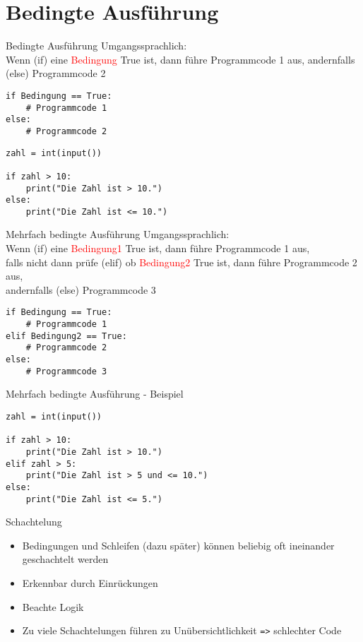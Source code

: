 \section{Bedingte Ausführung}

\begin{frame}[fragile]{Bedingte Ausführung}
Umgangssprachlich:\\ Wenn (if) eine \textcolor{red}{Bedingung} True ist, dann führe Programmcode 1 aus, andernfalls (else) Programmcode 2\\

\begin{lstlisting}
if Bedingung == True:
	# Programmcode 1 
else:
	# Programmcode 2 
\end{lstlisting}

\begin{lstlisting}
zahl = int(input())

if zahl > 10:
	print("Die Zahl ist > 10.")
else:
	print("Die Zahl ist <= 10.")
\end{lstlisting}
\end{frame}

\begin{frame}[fragile]{Mehrfach bedingte Ausführung}
Umgangssprachlich:\\ Wenn (if) eine \textcolor{red}{Bedingung1} True ist, dann führe Programmcode 1 aus, \\falls nicht dann prüfe (elif) ob \textcolor{red}{Bedingung2} True ist, dann führe Programmcode 2 aus, \\andernfalls (else) Programmcode 3\\

\begin{lstlisting}
if Bedingung == True:
	# Programmcode 1
elif Bedingung2 == True:
	# Programmcode 2
else:
	# Programmcode 3
\end{lstlisting}
\end{frame}

\begin{frame}[fragile]{Mehrfach bedingte Ausführung - Beispiel}
\begin{lstlisting}
zahl = int(input())

if zahl > 10:
	print("Die Zahl ist > 10.")
elif zahl > 5:
	print("Die Zahl ist > 5 und <= 10.")
else:
	print("Die Zahl ist <= 5.")
\end{lstlisting}
\end{frame}

\begin{frame}[fragile]{Schachtelung}
\begin{itemize}
	\item Bedingungen und Schleifen (dazu später) können beliebig oft ineinander geschachtelt werden
	\item Erkennbar durch Einrückungen
	\item Beachte Logik
	\item Zu viele Schachtelungen führen zu Unübersichtlichkeit \texttt{=>} schlechter Code
\end{itemize}
\end{frame}


